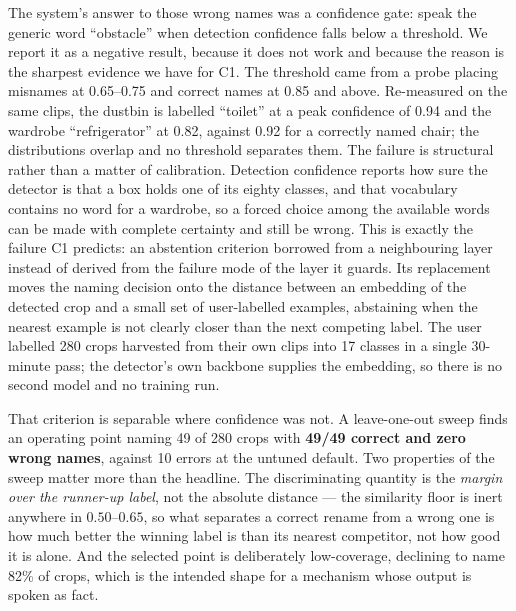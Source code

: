 \documentclass[sigconf,nonacm]{acmart}
\begin{document}
The system's answer to those wrong names was a confidence gate: speak the
generic word ``obstacle'' when detection confidence falls below a threshold. We
report it as a negative result, because it does not work and because the reason
is the sharpest evidence we have for C1. The threshold came from a probe placing
misnames at 0.65--0.75 and correct names at 0.85 and above. Re-measured on the
same clips, the dustbin is labelled ``toilet'' at a peak confidence of 0.94 and
the wardrobe ``refrigerator'' at 0.82, against 0.92 for a correctly named chair;
the distributions overlap and no threshold separates them. The failure is
structural rather than a matter of calibration. Detection confidence reports how
sure the detector is that a box holds one of its eighty classes, and that
vocabulary contains no word for a wardrobe, so a forced choice among the
available words can be made with complete certainty and still be wrong. This is
exactly the failure C1 predicts: an abstention criterion borrowed from a
neighbouring layer instead of derived from the failure mode of the layer it
guards. Its replacement moves the naming decision onto the distance between an
embedding of the detected crop and a small set of user-labelled examples,
abstaining when the nearest example is not clearly closer than the next
competing label. The user labelled 280 crops harvested from their own clips into
17 classes in a single 30-minute pass; the detector's own backbone supplies the
embedding, so there is no second model and no training run.

That criterion is separable where confidence was not. A leave-one-out sweep
finds an operating point naming 49 of 280 crops with \textbf{49/49 correct and
zero wrong names}, against 10 errors at the untuned default. Two properties of
the sweep matter more than the headline. The discriminating quantity is the
\emph{margin over the runner-up label}, not the absolute distance --- the
similarity floor is inert anywhere in $0.50$--$0.65$, so what separates a correct
rename from a wrong one is how much better the winning label is than its nearest
competitor, not how good it is alone. And the selected point is deliberately
low-coverage, declining to name 82\% of crops, which is the intended shape for a
mechanism whose output is spoken as fact.
\end{document}
